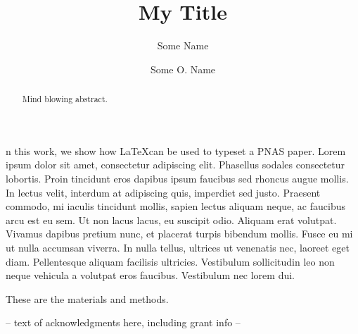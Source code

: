 \documentclass{pnastwo}
\begin{document}
\title{My Title}
\author{Some Name  \and 
Some O. Name}
\maketitle
\begin{article}
\begin{abstract}
Mind blowing abstract.
\end{abstract}

n this work, we show how \LaTeX can be used to typeset a PNAS paper. 
Lorem ipsum dolor sit amet, consectetur adipiscing elit. Phasellus sodales 
consectetur lobortis. Proin tincidunt eros dapibus ipsum faucibus sed rhoncus 
augue mollis. In lectus velit, interdum at adipiscing quis, imperdiet sed justo. 
Praesent commodo, mi iaculis tincidunt mollis, sapien lectus aliquam neque, ac 
faucibus arcu est eu sem. Ut non lacus lacus, eu suscipit odio. Aliquam erat 
volutpat. Vivamus dapibus pretium nunc, et placerat turpis bibendum mollis. 
Fusce eu mi ut nulla accumsan viverra. In nulla tellus, ultrices ut venenatis 
nec, laoreet eget diam. Pellentesque aliquam facilisis ultricies. Vestibulum 
sollicitudin leo non neque vehicula a volutpat eros faucibus. Vestibulum nec 
lorem dui.

\begin{materials}
These are the materials and methods.
\end{materials}

\begin{acknowledgments}
-- text of acknowledgments here, including grant info --
\end{acknowledgments}

\end{article}
\end{document}
